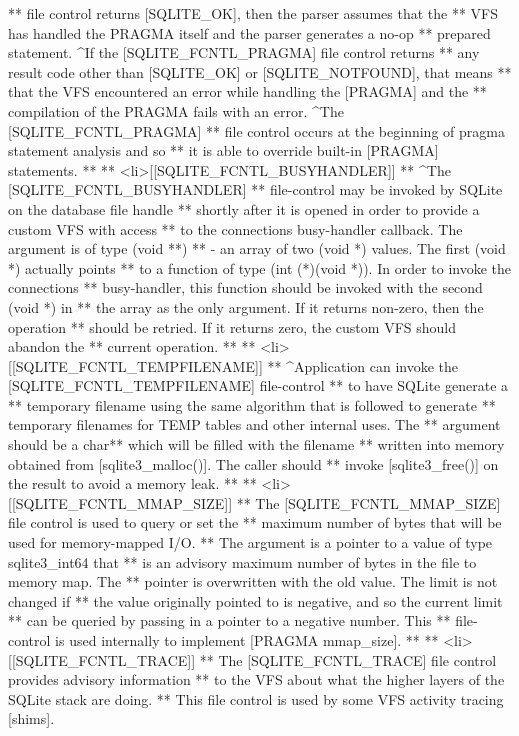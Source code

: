\begin{Codex}[label=sqlite3.h,numbers=left]
{** file control returns [SQLITE_OK], then the parser assumes that the
** VFS has handled the PRAGMA itself and the parser generates a no-op
** prepared statement.  ^If the [SQLITE_FCNTL_PRAGMA] file control returns
** any result code other than [SQLITE_OK] or [SQLITE_NOTFOUND], that means
** that the VFS encountered an error while handling the [PRAGMA] and the
** compilation of the PRAGMA fails with an error.  ^The [SQLITE_FCNTL_PRAGMA]
** file control occurs at the beginning of pragma statement analysis and so
** it is able to override built-in [PRAGMA] statements.
**
** <li>[[SQLITE_FCNTL_BUSYHANDLER]]
** ^The [SQLITE_FCNTL_BUSYHANDLER]
** file-control may be invoked by SQLite on the database file handle
** shortly after it is opened in order to provide a custom VFS with access
** to the connections busy-handler callback. The argument is of type (void **)
** - an array of two (void *) values. The first (void *) actually points
** to a function of type (int (*)(void *)). In order to invoke the connections
** busy-handler, this function should be invoked with the second (void *) in
** the array as the only argument. If it returns non-zero, then the operation
** should be retried. If it returns zero, the custom VFS should abandon the
** current operation.
**
** <li>[[SQLITE_FCNTL_TEMPFILENAME]]
** ^Application can invoke the [SQLITE_FCNTL_TEMPFILENAME] file-control
** to have SQLite generate a
** temporary filename using the same algorithm that is followed to generate
** temporary filenames for TEMP tables and other internal uses.  The
** argument should be a char** which will be filled with the filename
** written into memory obtained from [sqlite3_malloc()].  The caller should
** invoke [sqlite3_free()] on the result to avoid a memory leak.
**
** <li>[[SQLITE_FCNTL_MMAP_SIZE]]
** The [SQLITE_FCNTL_MMAP_SIZE] file control is used to query or set the
** maximum number of bytes that will be used for memory-mapped I/O.
** The argument is a pointer to a value of type sqlite3_int64 that
** is an advisory maximum number of bytes in the file to memory map.  The
** pointer is overwritten with the old value.  The limit is not changed if
** the value originally pointed to is negative, and so the current limit 
** can be queried by passing in a pointer to a negative number.  This
** file-control is used internally to implement [PRAGMA mmap_size].
**
** <li>[[SQLITE_FCNTL_TRACE]]
** The [SQLITE_FCNTL_TRACE] file control provides advisory information
** to the VFS about what the higher layers of the SQLite stack are doing.
** This file control is used by some VFS activity tracing [shims].
}
\end{Codex}
